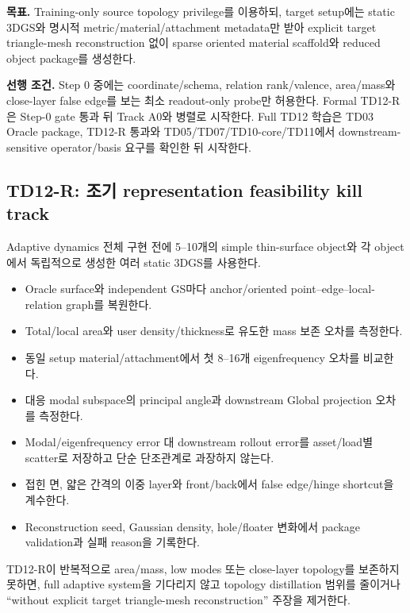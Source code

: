 \documentclass[10pt,a4paper]{article}
\newcommand{\todo}{\textcolor{TodoGray}{\(\square\)}}
\begin{document}
\textbf{목표.}
Training-only source topology privilege를 이용하되, target setup에는 static 3DGS와 명시적 metric/material/attachment metadata만 받아
explicit target triangle-mesh reconstruction 없이 sparse oriented material scaffold와 reduced object package를 생성한다.

\textbf{선행 조건.}
Step 0 중에는 coordinate/schema, relation rank/valence, area/mass와 close-layer false edge를
보는 최소 readout-only probe만 허용한다.
Formal TD12-R은 Step-0 gate 통과 뒤 Track A0와 병렬로 시작한다.
Full TD12 학습은 TD03 Oracle package, TD12-R 통과와 TD05/TD07/TD10-core/TD11에서 downstream-sensitive operator/basis 요구를 확인한 뒤 시작한다.

\subsection*{TD12-R: 조기 representation feasibility kill track}

Adaptive dynamics 전체 구현 전에 5--10개의 simple thin-surface object와 각 object에서 독립적으로 생성한 여러 static 3DGS를 사용한다.

\begin{itemize}
  \item[\todo] Oracle surface와 independent GS마다 anchor/oriented point--edge--local-relation graph를 복원한다.
  \item[\todo] Total/local area와 user density/thickness로 유도한 mass 보존 오차를 측정한다.
  \item[\todo] 동일 setup material/attachment에서 첫 8--16개 eigenfrequency 오차를 비교한다.
  \item[\todo] 대응 modal subspace의 principal angle과 downstream Global projection 오차를 측정한다.
  \item[\todo] Modal/eigenfrequency error 대 downstream rollout error를 asset/load별 scatter로 저장하고 단순 단조관계로 과장하지 않는다.
  \item[\todo] 접힌 면, 얇은 간격의 이중 layer와 front/back에서 false edge/hinge shortcut을 계수한다.
  \item[\todo] Reconstruction seed, Gaussian density, hole/floater 변화에서 package validation과 실패 reason을 기록한다.
\end{itemize}

TD12-R이 반복적으로 area/mass, low modes 또는 close-layer topology를 보존하지 못하면,
full adaptive system을 기다리지 않고 topology distillation 범위를 줄이거나
``without explicit target triangle-mesh reconstruction'' 주장을 제거한다.
\end{document}
